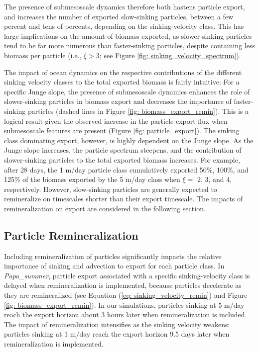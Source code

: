 \documentclass[draft,linenumbers]{agujournal2018}
\begin{document}
The presence of submesoscale dynamics therefore both hastens particle export, and increases the number of exported slow-sinking particles, between a few percent and tens of percents, depending on the sinking-velocity class. This has large implications on the amount of biomass exported, as slower-sinking particles tend to be far more numerous than faster-sinking particles, despite containing less biomass per particle (i.e., $\xi >3$; see Figure \ref{fig: sinking_velocity_spectrum}). %

The impact of ocean dynamics on the respective contributions of the different sinking velocity classes to the total exported biomass is fairly intuitive: For a specific Junge slope, the presence of submesoscale dynamics enhances the role of slower-sinking particles in biomass export and decreases the importance of faster-sinking particles (dashed lines in Figure \ref{fig: biomass_export_remin}). This is a logical result given the observed increase in the particle export flux when submesoscale features are present (Figure \ref{fig: particle_export}). The sinking class dominating export, however, is highly dependent on the Junge slope. As the Junge slope increases, the particle spectrum steepens, and the contribution of slower-sinking particles to the total exported biomass increases. For example, after 28 days, the 1 m/day particle class cumulatively exported 50\%, 100\%, and 125\% of the biomass exported by the 5 m/day class when $\xi =$ 2, 3, and 4, respectively. However, slow-sinking particles are generally expected to remineralize on timescales shorter than their export timescale. The impacts of remineralization on export are considered in the following section.


 \subsection{Particle Remineralization}
 \label{sec: results_remin}
 
 Including remineralization of particles significantly impacts the relative importance of sinking and advection to export for each particle class. In \textit{Papa\_summer}, particle export associated with a specific sinking-velocity class is delayed when remineralization is implemented, because particles decelerate as they are remineralized (see Equation (\ref{eq: sinking_velocity_remin}) and Figure \ref{fig: biomass_export_remin}). In our simulations, particles sinking at 5 m/day reach the export horizon about 3 hours later when remineralization is included. The impact of remineralization intensifies as the sinking velocity weakens: particles sinking at 1 m/day reach the export horizon 9.5 days later when remineralization is implemented.
 
\end{document}
